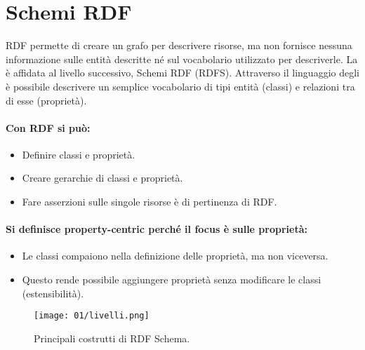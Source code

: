 
\section{Schemi RDF}

RDF permette di creare un grafo per
descrivere risorse, ma non fornisce
nessuna informazione sulle entità
descritte né sul vocabolario utilizzato per descriverle. La  è affidata
al livello successivo, Schemi RDF (RDFS). Attraverso il linguaggio degli  è possibile descrivere un semplice
vocabolario di tipi entità (classi) e
relazioni tra di esse (proprietà).


\paragraph{Con RDF si può:}

\begin{itemize}
  \item Definire classi e proprietà. 
  \item Creare gerarchie di classi e proprietà. 
  \item Fare asserzioni sulle singole risorse è di pertinenza di RDF. 
\end{itemize}

\paragraph{Si definisce property-centric perché il focus è sulle proprietà:}

\begin{itemize}
  \item Le classi compaiono nella definizione delle proprietà, ma non
viceversa. 
\item Questo rende possibile aggiungere proprietà senza modificare le
classi (estensibilità). 
\end{itemize}

\begin{figure}[h]
    \centering
    \texttt{[image: 01/livelli.png]}
    \caption{Principali costrutti di RDF Schema.}
\end{figure}


